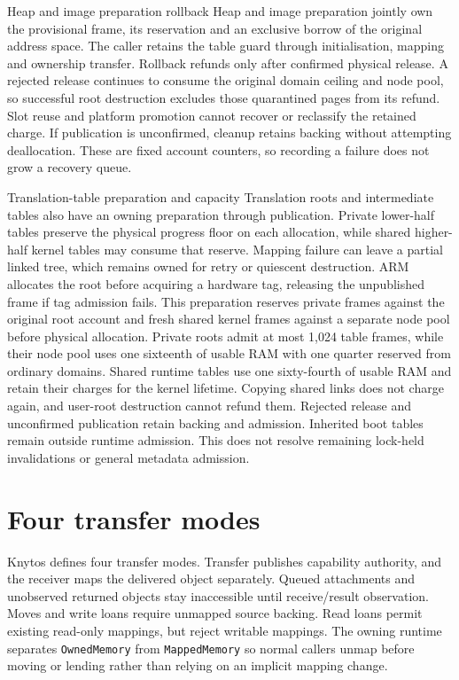 \begin{implementationdetail}{Heap and image preparation rollback}
Heap and image preparation jointly own the provisional frame, its reservation
and an exclusive borrow of the original address space. The caller retains the
table guard through initialisation, mapping and ownership transfer. Rollback
refunds only after confirmed physical release. A rejected release continues to
consume the original domain ceiling and node pool, so successful root destruction
excludes those quarantined pages from its refund. Slot reuse and platform
promotion cannot recover or reclassify the retained charge. If publication is
unconfirmed, cleanup retains backing without attempting deallocation. These
are fixed account counters, so recording a failure does not grow a recovery queue.
\end{implementationdetail}

\begin{implementationdetail}{Translation-table preparation and capacity}
Translation roots and intermediate tables also have an owning preparation
through publication. Private lower-half tables preserve the physical progress
floor on each allocation, while shared higher-half kernel tables may consume that
reserve. Mapping failure can leave a partial linked tree, which remains owned
for retry or quiescent destruction. ARM allocates the root before acquiring a
hardware tag, releasing the unpublished frame if tag admission fails. This
preparation reserves private frames against the original root account and fresh
shared kernel frames against a separate node pool before physical allocation.
Private roots admit at most 1,024 table frames, while their node pool uses one sixteenth
of usable RAM with one quarter reserved from ordinary domains. Shared runtime
tables use one sixty-fourth of usable RAM and retain their charges for the kernel
lifetime. Copying shared links does not charge again, and user-root destruction
cannot refund them. Rejected release and unconfirmed publication retain backing
and admission. Inherited boot tables remain outside runtime admission. This
does not resolve remaining lock-held invalidations or general metadata admission.
\end{implementationdetail}

\section{Four transfer modes}

Knytos defines four transfer modes. Transfer publishes capability authority, and
the receiver maps the delivered object separately. Queued attachments and
unobserved returned objects stay inaccessible until receive/result observation.
Moves and write loans require unmapped source backing. Read loans permit existing
read-only mappings, but reject writable mappings. The owning runtime separates
\texttt{OwnedMemory} from \texttt{MappedMemory} so normal callers unmap before
moving or lending rather than relying on an implicit mapping change.

